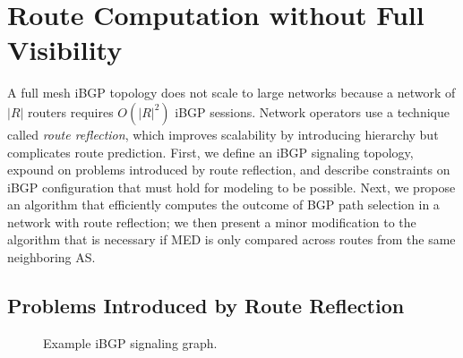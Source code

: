 


\section{Route Computation without Full Visibility}
\label{sec:best_egress}

A full mesh iBGP topology does not scale to large networks because a
network of $|R|$ routers requires $O(|R|^2)$ iBGP sessions.  Network
operators use a technique called {\em route reflection}, which improves
scalability by introducing hierarchy but complicates route prediction.
%
First, we define an iBGP
signaling topology, expound on problems introduced by route reflection,
and
describe constraints on iBGP configuration that must hold for modeling
to be possible. Next, we propose an algorithm that
efficiently computes the outcome of BGP path selection in a network with
route reflection; we then present a minor
modification to the algorithm that is necessary if MED is only compared
across routes from the same neighboring AS.

\subsection{Problems Introduced by Route Reflection}\label{sec:problems_rr}

\begin{figure}
\begin{center}
\begin{psfrags}
\end{psfrags}
\end{center}
\caption{Example iBGP signaling graph.}
\label{fig:ibgp}
\end{figure}


